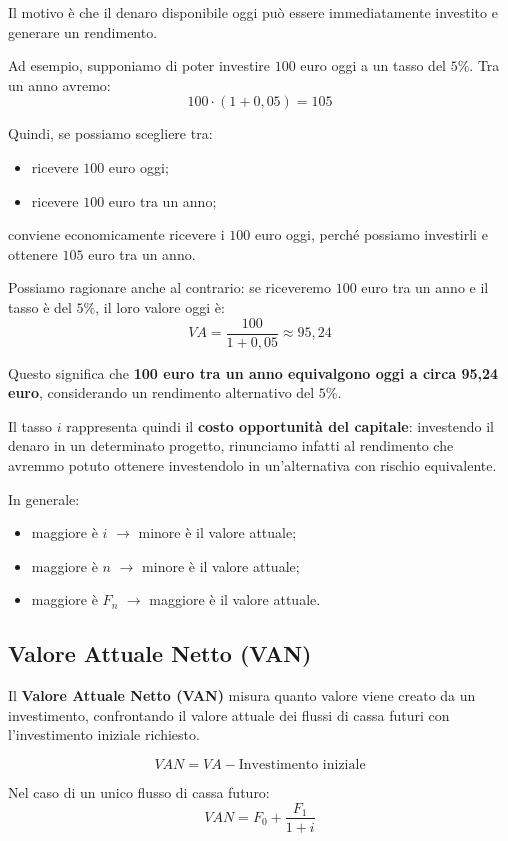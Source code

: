 \noindent Il motivo è che il denaro disponibile oggi può essere immediatamente investito e generare un rendimento.

\noindent Ad esempio, supponiamo di poter investire \(100\) euro oggi a un tasso del \(5\%\). Tra un anno avremo:
\[
100 \cdot (1+0{,}05) = 105
\]

\noindent Quindi, se possiamo scegliere tra:
\begin{itemize}
    \item ricevere \(100\) euro oggi;
    \item ricevere \(100\) euro tra un anno;
\end{itemize}
conviene economicamente ricevere i \(100\) euro oggi, perché possiamo investirli e ottenere \(105\) euro tra un anno.

\noindent Possiamo ragionare anche al contrario: se riceveremo \(100\) euro tra un anno e il tasso è del \(5\%\), il loro valore oggi è:
\[
VA = \frac{100}{1+0{,}05} \approx 95{,}24
\]

\noindent Questo significa che \textbf{100 euro tra un anno equivalgono oggi a circa 95,24 euro}, considerando un rendimento alternativo del \(5\%\).

\noindent Il tasso \(i\) rappresenta quindi il \textbf{costo opportunità del capitale}: investendo il denaro in un determinato progetto, 
rinunciamo infatti al rendimento che avremmo potuto ottenere investendolo in un'alternativa con rischio equivalente.

\noindent In generale:
\begin{itemize}
    \item maggiore è \(i\) $\rightarrow$ minore è il valore attuale;
    \item maggiore è \(n\) $\rightarrow$ minore è il valore attuale;
    \item maggiore è \(F_n\) $\rightarrow$ maggiore è il valore attuale.
\end{itemize}

\subsection{Valore Attuale Netto (VAN)}
Il \textbf{Valore Attuale Netto (VAN)} misura quanto valore viene creato da un investimento, 
confrontando il valore attuale dei flussi di cassa futuri con l'investimento iniziale richiesto.

\[
VAN = VA - \text{Investimento iniziale}
\]

\noindent Nel caso di un unico flusso di cassa futuro:
\[
VAN = F_0 + \frac{F_1}{1+i}
\]


